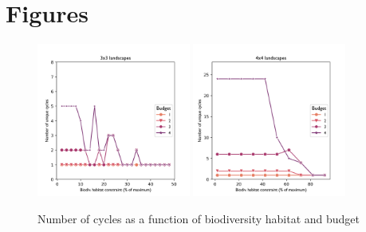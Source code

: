 \clearpage

\section{Figures}
\begin{figure}[H]
    \centering
    \includegraphics[width = 0.45\textwidth]{figures/wildland/number_cycles3.png}
    \includegraphics[width = 0.45\textwidth]{figures/wildland/number_cycles4.png}
    \caption{Number of cycles as a function of biodiversity habitat and budget}
    \label{fig:distrib_cycles}
\end{figure}
\newpage

